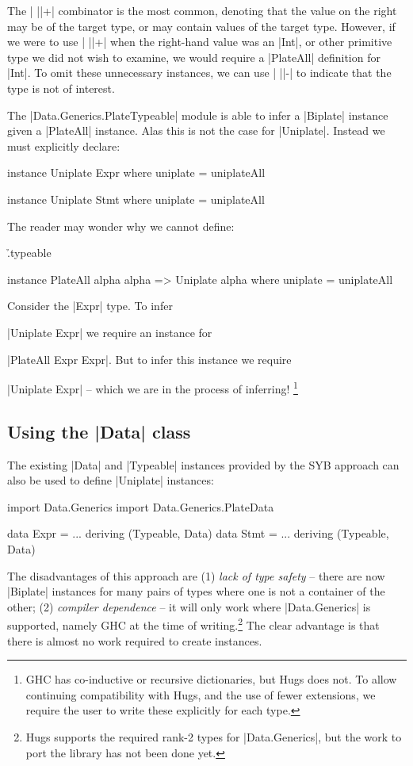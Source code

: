 The | ||+| combinator is the most common, denoting that the value on the right may be of the target type, or may contain values of the target type. However, if we were to use | ||+| when the right-hand value was an |Int|, or other primitive type we did not wish to examine, we would require a |PlateAll| definition for |Int|. To omit these unnecessary instances, we can use | ||-| to indicate that the type is not of interest.

The |Data.Generics.PlateTypeable| module is able to infer a |Biplate| instance given a |PlateAll| instance. Alas this is not the case for |Uniplate|. Instead we must explicitly declare:

\ignore\begin{code}
instance Uniplate Expr where
    uniplate = uniplateAll

instance Uniplate Stmt where
    uniplate = uniplateAll
\end{code}

The reader may wonder why we cannot define:

\h{.typeable}\begin{code}
instance PlateAll alpha alpha => Uniplate alpha where
    uniplate = uniplateAll
\end{code}

Consider the |Expr| type. To infer \ignore|Uniplate Expr| we require an instance for \ignore|PlateAll Expr Expr|. But to infer this instance we require \ignore|Uniplate Expr| -- which we are in the process of inferring! \footnote{GHC has co-inductive or recursive dictionaries, but Hugs does not. To allow continuing compatibility with Hugs, and the use of fewer extensions, we require the user to write these explicitly for each type.}


\subsection{Using the |Data| class}
\label{secU:implement_playdata}

The existing |Data| and |Typeable| instances provided by the SYB approach can also be used to define |Uniplate| instances:

\ignore\begin{code}
import Data.Generics
import Data.Generics.PlateData

data Expr  = ... \? \? deriving (Typeable, Data)
data Stmt  = ... \? \? deriving (Typeable, Data)
\end{code}

The disadvantages of this approach are (1) \textit{lack of type safety} -- there are now |Biplate| instances for many pairs of types where one is not a container of the other; (2) \textit{compiler dependence} -- it will only work where |Data.Generics| is supported, namely GHC at the time of writing.\footnote{Hugs supports the required rank-2 types for |Data.Generics|, but the work to port the library has not been done yet.} The clear advantage is that there is almost no work required to create instances.

